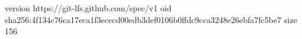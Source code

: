 version https://git-lfs.github.com/spec/v1
oid sha256:4f134c76ca17eca1f3ececd00edb3def0106b0ffdc9cca3248e26ebfa7fc5be7
size 156
